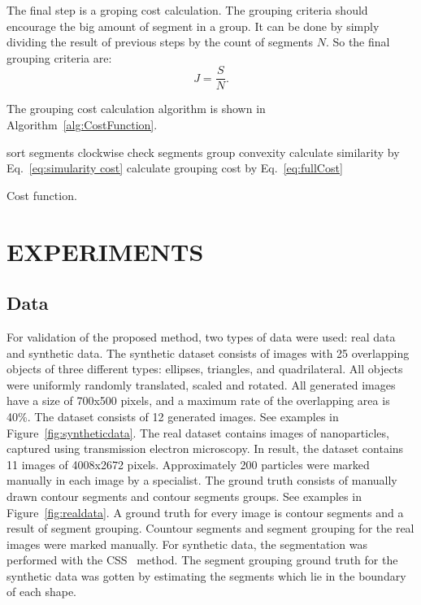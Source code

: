 \documentclass{lutmscthesis}[2010/09/22]
\begin{document}
The final step is a groping cost calculation.  The grouping criteria should encourage the big amount of segment in a group. It can be done by simply dividing the result of previous steps by the count of segments $N$. So the final grouping criteria are:
\begin{equation}
    J = \frac{S}{N}.
    \label{eq:fullCost}
\end{equation}

The grouping cost calculation algorithm is shown in Algorithm~\ref{alg:CostFunction}.


\begin{algorithm} [H]
    \SetAlgoLined
     {
     \Return {$\infty$ }
    }
    sort segments clockwise\;
    check segments group convexity\;
     {
        \Return {$\infty$ }
    }
    calculate similarity by Eq.~\ref{eq:simularity cost}\;
    calculate grouping cost by Eq.~\ref{eq:fullCost}\;
\caption{Cost function.}\label{alg:CostFunction}
\end{algorithm}

\section{EXPERIMENTS}
\label{sec:experiments}

\subsection{Data}
For validation of the proposed method, two types of data were used: real data and synthetic data.
The synthetic dataset consists of images with 25 overlapping
objects of three different types: ellipses, triangles, and quadrilateral. All objects were uniformly randomly translated, scaled and rotated. All generated images have a size of 700x500 pixels, and a maximum rate of the overlapping area is 40\%. The dataset consists of 12 generated images. See examples in Figure~\ref{fig:syntheticdata}.
The real dataset contains images of nanoparticles, captured
using transmission electron microscopy. In result, the dataset contains 11 images of 4008x2672 pixels. Approximately 200 particles were marked manually in each image by a specialist. The ground truth consists of manually drawn contour segments and contour segments groups. See examples in Figure~\ref{fig:realdata}.
A ground truth for every image is contour segments and a result of segment grouping. Countour segments and segment grouping for the real images were marked manually. For synthetic data, the segmentation was performed with the CSS~\cite{CSS} method. The segment grouping ground truth for the synthetic data was gotten by estimating the segments which lie in the boundary of each shape.   
\end{document}
